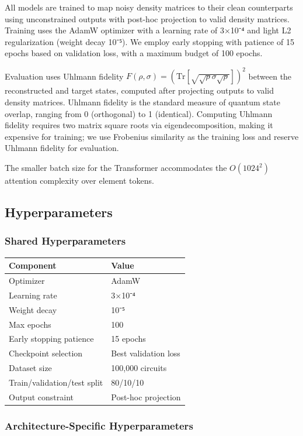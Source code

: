 \documentclass[11pt]{article}
\begin{document}
All models are trained to map noisy density matrices to their clean counterparts using unconstrained outputs with post-hoc projection to valid density matrices. Training uses the AdamW optimizer with a learning rate of 3×10⁻⁴ and light L2 regularization (weight decay 10⁻⁵). We employ early stopping with patience of 15 epochs based on validation loss, with a maximum budget of 100 epochs.

Evaluation uses Uhlmann fidelity \(F(\rho, \sigma) = (\mathrm{Tr}[\sqrt{\sqrt{\rho}\sigma\sqrt{\rho}}])^2\) between the reconstructed and target states, computed after projecting outputs to valid density matrices. Uhlmann fidelity is the standard measure of quantum state overlap, ranging from 0 (orthogonal) to 1 (identical). Computing Uhlmann fidelity requires two matrix square roots via eigendecomposition, making it expensive for training; we use Frobenius similarity as the training loss and reserve Uhlmann fidelity for evaluation.

The smaller batch size for the Transformer accommodates the \(O(1024^2)\) attention complexity over element tokens.
\subsection{Hyperparameters}
\label{sec:orgf3f62bc}
\subsubsection{Shared Hyperparameters}
\label{sec:org984b381}

\begin{center}
\begin{tabular}{ll}
Component & Value\\
\hline
Optimizer & AdamW\\
Learning rate & 3×10⁻⁴\\
Weight decay & 10⁻⁵\\
Max epochs & 100\\
Early stopping patience & 15 epochs\\
Checkpoint selection & Best validation loss\\
Dataset size & 100,000 circuits\\
Train/validation/test split & 80/10/10\\
Output constraint & Post-hoc projection\\
\end{tabular}
\end{center}
\subsubsection{Architecture-Specific Hyperparameters}
\label{sec:orgc397fd7}
\end{document}
